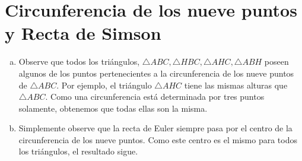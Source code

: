 \section{Circunferencia de los nueve puntos y Recta de Simson}


\begin{sol}
	\begin{enumerate}[a.]
		\item Observe que todos los tri\'angulos, $\triangle ABC,\triangle HBC,\triangle AHC,\triangle ABH$ poseen algunos  de los puntos pertenecientes a la circunferencia de los nueve puntos de $\triangle ABC$. Por ejemplo, el tri\'angulo $\triangle AHC$ tiene las mismas alturas que $\triangle ABC$. Como una circunferencia est\'a determinada por tres puntos solamente, obtenemos que todas ellas son la misma. 
		\item Simplemente observe que la recta de Euler siempre pasa por el centro de la circunferencia de los nueve puntos. Como este centro es el mismo para todos los tri\'angulos, el resultado sigue.
	\end{enumerate}
\end{sol}